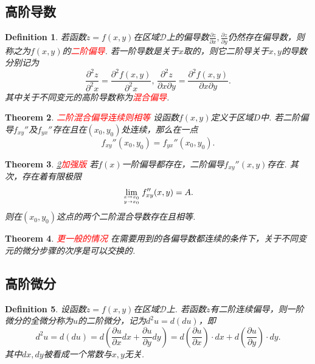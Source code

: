 \documentclass{article}
\newtheorem{theorem}{Theorem}[section]
\newtheorem{definition}[theorem]{Definition}
\newcommand{\redt}[1]{\textcolor{red}{#1}}
\begin{document}
\subsection{高阶导数}

\begin{definition}
\rm 若函数$z=f(x,y)$在区域$\mathcal{D}$上的偏导数$\frac{\partial z}{\partial x},\frac{\partial z}{\partial y}$仍然存在偏导数，则称之为$f(x,y)$的\redt{二阶偏导}. 若一阶导数是关于$x$取的，则它二阶导关于$x,y$的导数分别记为
$$
\frac{\partial^2z}{\partial^2 x} = \frac{\partial^2 f(x,y)}{\partial^2 x},\, \frac{\partial^2z}{\partial x \partial y} = \frac{\partial^2 f(x,y)}{\partial x \partial y}.  
$$
其中关于不同变元的高阶导数称为\redt{混合偏导}.
\end{definition}

\begin{theorem}\label{mixed-derivatives: exchange-order}
\rm \redt{二阶混合偏导连续则相等} 设函数$f(x,y)$定义于区域$D$中. 若二阶偏导$f_{xy}''$及$f_{yx}''$存在且在$(x_0,y_0)$处连续，那么在一点
$$
f_{xy}''(x_0,y_0) = f_{yx}''(x_0,y_0).
$$
\end{theorem}

\begin{theorem}
\rm \redt{\ref{mixed-derivatives: exchange-order}加强版} 若$f(x)$一阶偏导都存在，二阶偏导$f_{xy}''(x,y)$存在. 其次，存在着有限极限
$$
\lim\limits_{x \rightarrow x_0 \atop y \rightarrow x_0} f_{xy}''(x,y) = A.
$$
则在$(x_0,y_0)$这点的两个二阶混合导数存在且相等.
\end{theorem}

\begin{theorem}
\rm \redt{更一般的情况} 在需要用到的各偏导数都连续的条件下，关于不同变元的微分步骤的次序是可以交换的. 
\end{theorem}


\subsection{高阶微分}

\begin{definition}
\rm 设函数$z=f(x,y)$在区域$\mathcal{D}$上. 若函数$z$有二阶连续偏导，则一阶微分的全微分称为$u$的二阶微分，记为$d^2 u = d(du)$，即
$$
d^2 u = d(du) = d(\frac{\partial u}{\partial x}dx + \frac{\partial u}{\partial y}dy) = d\left(\frac{\partial u}{\partial x}\right)\cdot dx + d\left(\frac{\partial u}{\partial y}\right)\cdot dy.
$$
其中$dx,dy$被看成一个常数与$x,y$无关. 
\end{definition}
\end{document}

